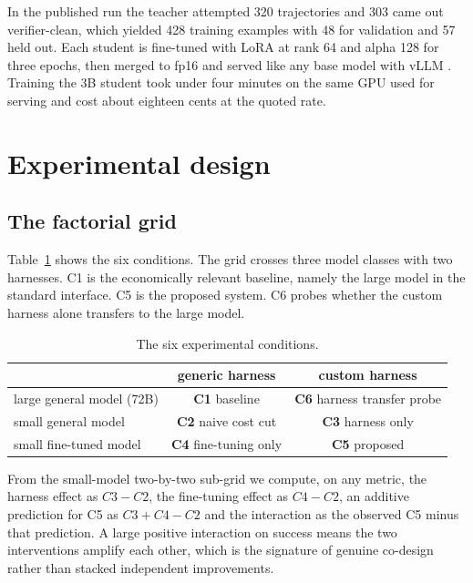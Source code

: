 \documentclass[11pt]{article}
\begin{document}
In the published run the teacher attempted 320 trajectories and 303 came out
verifier-clean, which yielded 428 training examples with 48 for validation
and 57 held out. Each student is fine-tuned with LoRA \citep{hu2022lora} at
rank 64 and alpha 128 for three epochs, then merged to fp16 and served like
any base model with vLLM \citep{kwon2023vllm}. Training the 3B student took
under four minutes on the same GPU used for serving and cost about eighteen
cents at the quoted rate.

\section{Experimental design}

\subsection{The factorial grid}

Table~\ref{tab:grid} shows the six conditions. The grid crosses three model
classes with two harnesses. C1 is the economically relevant baseline, namely
the large model in the standard interface. C5 is the proposed system. C6
probes whether the custom harness alone transfers to the large model.

\begin{table}[t]
  \centering
  \small
  \caption{The six experimental conditions.}
  \label{tab:grid}
  \begin{tabular}{lcc}
    \toprule
     & generic harness & custom harness \\
    \midrule
    large general model (72B) & \textbf{C1} baseline & \textbf{C6} harness transfer probe \\
    small general model       & \textbf{C2} naive cost cut & \textbf{C3} harness only \\
    small fine-tuned model    & \textbf{C4} fine-tuning only & \textbf{C5} proposed \\
    \bottomrule
  \end{tabular}
\end{table}

From the small-model two-by-two sub-grid we compute, on any metric, the
harness effect as $C3 - C2$, the fine-tuning effect as $C4 - C2$, an additive
prediction for C5 as $C3 + C4 - C2$ and the interaction as the observed C5
minus that prediction. A large positive interaction on success means the two
interventions amplify each other, which is the signature of genuine
co-design rather than stacked independent improvements.
\end{document}
